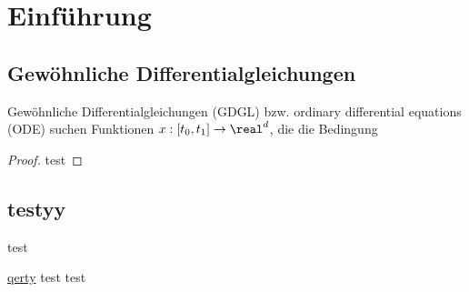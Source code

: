 \chapter*{Einführung}
\section{Gewöhnliche Differentialgleichungen}
Gewöhnliche Differentialgleichungen (GDGL) bzw. ordinary differential
equations (ODE) suchen Funktionen $x : [t_0, t_1] \to \real^d$, die die
Bedingung 

\begin{proof}
test
\end{proof}
\section{testyy}
\begin{alphlist}
\item test
\end{alphlist}
\ul{qerty}
test \enter test
